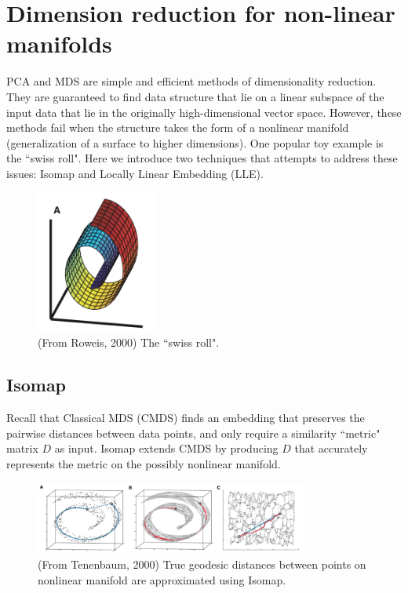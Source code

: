 \documentclass[11pt]{article}
\begin{document}
\section*{Dimension reduction for non-linear manifolds}
PCA and MDS are simple and efficient methods of dimensionality reduction. They are guaranteed to find data structure that lie on a linear subspace of the input data that lie in the originally high-dimensional vector space. However, these methods fail when the structure takes the form of a nonlinear manifold (generalization of a surface to higher dimensions). One popular toy example is the ``swiss roll". Here we introduce two techniques that attempts to address these issues: Isomap and Locally Linear Embedding (LLE).

\begin{figure}[H]
\centering
\includegraphics[width=4cm]{swissroll.png}
\caption{(From Roweis, 2000) The ``swiss roll".}
\end{figure}

\subsection*{Isomap}

Recall that Classical MDS (CMDS) finds an embedding that preserves the pairwise distances between data points, and only require a similarity ``metric" matrix $D$ as input. Isomap extends CMDS by producing $D$ that accurately represents the metric on the possibly nonlinear manifold. \\

\begin{figure}[H]
\centering
\includegraphics[width=9cm]{isomap.png}
\caption{(From Tenenbaum, 2000) True geodesic distances between points on nonlinear manifold are approximated using Isomap.}
\end{figure}
\end{document}
